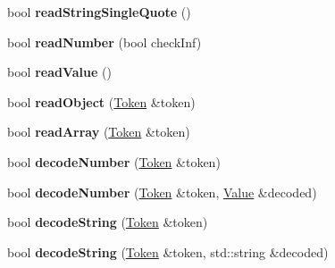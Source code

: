 \begin{DoxyCompactItemize}
\item 
\hypertarget{class_json_1_1_our_reader_ac78592defdc333faf56c6d0908758da3}{}bool {\bfseries read\+String\+Single\+Quote} ()\label{class_json_1_1_our_reader_ac78592defdc333faf56c6d0908758da3}

\item 
\hypertarget{class_json_1_1_our_reader_aefcb9a78cc45870ccac2db2a66c8ec50}{}bool {\bfseries read\+Number} (bool check\+Inf)\label{class_json_1_1_our_reader_aefcb9a78cc45870ccac2db2a66c8ec50}

\item 
\hypertarget{class_json_1_1_our_reader_a1765d9670d191c89a57a22ea5591d35f}{}bool {\bfseries read\+Value} ()\label{class_json_1_1_our_reader_a1765d9670d191c89a57a22ea5591d35f}

\item 
\hypertarget{class_json_1_1_our_reader_aea198f8101dba55099f4d8121a993530}{}bool {\bfseries read\+Object} (\hyperlink{class_json_1_1_our_reader_1_1_token}{Token} \&token)\label{class_json_1_1_our_reader_aea198f8101dba55099f4d8121a993530}

\item 
\hypertarget{class_json_1_1_our_reader_a0b9f58faf4212c6ecb5d8e2a1ac10257}{}bool {\bfseries read\+Array} (\hyperlink{class_json_1_1_our_reader_1_1_token}{Token} \&token)\label{class_json_1_1_our_reader_a0b9f58faf4212c6ecb5d8e2a1ac10257}

\item 
\hypertarget{class_json_1_1_our_reader_a272d271290933a89abfd5096dd69c9e9}{}bool {\bfseries decode\+Number} (\hyperlink{class_json_1_1_our_reader_1_1_token}{Token} \&token)\label{class_json_1_1_our_reader_a272d271290933a89abfd5096dd69c9e9}

\item 
\hypertarget{class_json_1_1_our_reader_a712270d53a2f023c2f406ac813548340}{}bool {\bfseries decode\+Number} (\hyperlink{class_json_1_1_our_reader_1_1_token}{Token} \&token, \hyperlink{class_json_1_1_value}{Value} \&decoded)\label{class_json_1_1_our_reader_a712270d53a2f023c2f406ac813548340}

\item 
\hypertarget{class_json_1_1_our_reader_a34e31d8b8399b7ad493359702b6de6c9}{}bool {\bfseries decode\+String} (\hyperlink{class_json_1_1_our_reader_1_1_token}{Token} \&token)\label{class_json_1_1_our_reader_a34e31d8b8399b7ad493359702b6de6c9}

\item 
\hypertarget{class_json_1_1_our_reader_a44b589a85f02f0e2de1b4ad6916be0c5}{}bool {\bfseries decode\+String} (\hyperlink{class_json_1_1_our_reader_1_1_token}{Token} \&token, std\+::string \&decoded)\label{class_json_1_1_our_reader_a44b589a85f02f0e2de1b4ad6916be0c5}


\end{DoxyCompactItemize}
